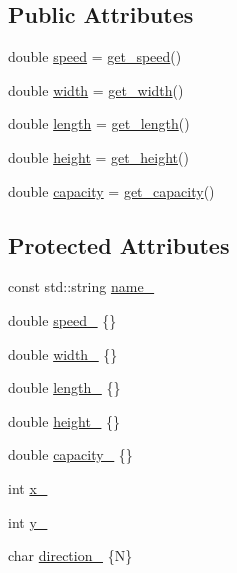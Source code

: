 \subsection*{Public Attributes}
\begin{DoxyCompactItemize}
\item 
double \hyperlink{classfp_1_1_land_based_robot_a098908304491425d6264e59d9412e696}{speed} = \hyperlink{classfp_1_1_land_based_robot_a44fed3a00505f6679ff8505aebae4505}{get\+\_\+speed}()
\item 
double \hyperlink{classfp_1_1_land_based_robot_a4e49ce0ab6b8b0e4a998d5ce82303f8d}{width} = \hyperlink{classfp_1_1_land_based_robot_a523b439167030a7ab1e0e7f6c8d42315}{get\+\_\+width}()
\item 
double \hyperlink{classfp_1_1_land_based_robot_aa96f1f19673132a99ce0b417faed83d3}{length} = \hyperlink{classfp_1_1_land_based_robot_adb03fbded9a3b0553301bcc0322cb1c1}{get\+\_\+length}()
\item 
double \hyperlink{classfp_1_1_land_based_robot_a6b1ece64bf32bbe509042ccb80a2ab33}{height} = \hyperlink{classfp_1_1_land_based_robot_ac77253c989c417ee26654541c50669d4}{get\+\_\+height}()
\item 
double \hyperlink{classfp_1_1_land_based_robot_af906410bad105b30865b9a02fdd350f9}{capacity} = \hyperlink{classfp_1_1_land_based_robot_a24c0f6d395f3dfd6bdbcf5a2a9801de1}{get\+\_\+capacity}()
\end{DoxyCompactItemize}
\subsection*{Protected Attributes}
\begin{DoxyCompactItemize}
\item 
const std\+::string \hyperlink{classfp_1_1_land_based_robot_a548e8bdaead3c8ddbcaa9eac1121d1c5}{name\+\_\+}
\item 
double \hyperlink{classfp_1_1_land_based_robot_ae969157e5f910ed0a85198dc7f6c3cef}{speed\+\_\+} \{\}
\item 
double \hyperlink{classfp_1_1_land_based_robot_aae605323e9ce63f29dcded204421b1fc}{width\+\_\+} \{\}
\item 
double \hyperlink{classfp_1_1_land_based_robot_a9475d5886f329c92e68f0d86b4da58c0}{length\+\_\+} \{\}
\item 
double \hyperlink{classfp_1_1_land_based_robot_a34238a27d9055c416a3e6cfedc8ed248}{height\+\_\+} \{\}
\item 
double \hyperlink{classfp_1_1_land_based_robot_a542d90c7c62899e3c3cf28791bbb6c8e}{capacity\+\_\+} \{\}
\item 
int \hyperlink{classfp_1_1_land_based_robot_a55c2b5865fd60fb0158a135031f8b271}{x\+\_\+}
\item 
int \hyperlink{classfp_1_1_land_based_robot_a130cfd6ad383116076dc891ee3a52671}{y\+\_\+}
\item 
char \hyperlink{classfp_1_1_land_based_robot_adc8e6123fa8ffe86576e46000b0ae779}{direction\+\_\+} \{\textquotesingle{}N\textquotesingle{}\}
\end{DoxyCompactItemize}



